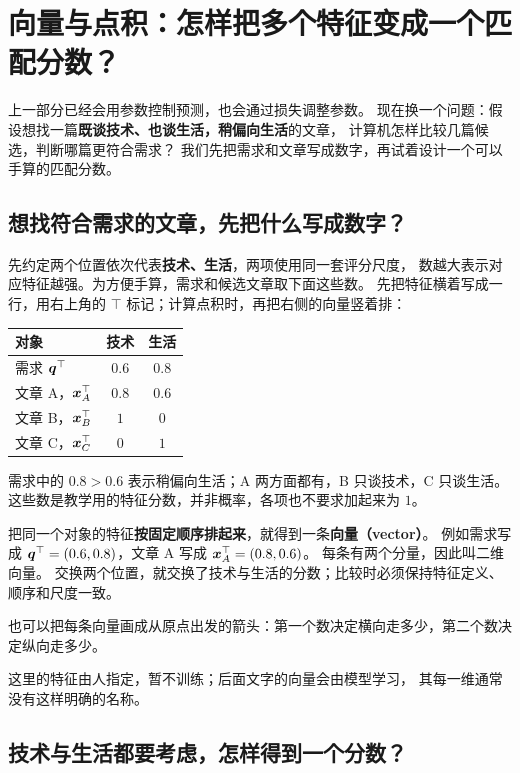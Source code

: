 \chapterrule
\section{向量与点积：怎样把多个特征变成一个匹配分数？}
\label{intro:vectors}
\label{intro:dot-product}

上一部分已经会用参数控制预测，也会通过损失调整参数。
现在换一个问题：假设想找一篇\textbf{既谈技术、也谈生活，稍偏向生活}的文章，
计算机怎样比较几篇候选，判断哪篇更符合需求？
我们先把需求和文章写成数字，再试着设计一个可以手算的匹配分数。

\subsection{想找符合需求的文章，先把什么写成数字？}

先约定两个位置依次代表\textbf{技术、生活}，两项使用同一套评分尺度，
数越大表示对应特征越强。为方便手算，需求和候选文章取下面这些数。
先把特征横着写成一行，用右上角的 $\top$ 标记；计算点积时，再把右侧的向量竖着排：
\begin{center}
\begin{tabular}{@{}lcc@{}}\toprule
对象 & 技术 & 生活\\\midrule
需求 $\boldsymbol{q}^\top$ & $0.6$ & $0.8$\\
文章 A，$\boldsymbol{x}_A^\top$ & $0.8$ & $0.6$\\
文章 B，$\boldsymbol{x}_B^\top$ & $1$ & $0$\\
文章 C，$\boldsymbol{x}_C^\top$ & $0$ & $1$\\\bottomrule
\end{tabular}
\end{center}
需求中的 $0.8>0.6$ 表示稍偏向生活；A 两方面都有，B 只谈技术，C 只谈生活。
这些数是教学用的特征分数，并非概率，各项也不要求加起来为 $1$。

\label{concept:vector}
把同一个对象的特征\textbf{按固定顺序排起来}，就得到一条\textbf{向量（vector）}。
例如需求写成 $\boldsymbol{q}^\top=(0.6,0.8)$，文章 A 写成 $\boldsymbol{x}_A^\top=(0.8,0.6)$。
每条有两个分量，因此叫二维向量。
交换两个位置，就交换了技术与生活的分数；比较时必须保持特征定义、顺序和尺度一致。

也可以把每条向量画成从原点出发的箭头：第一个数决定横向走多少，第二个数决定纵向走多少。


这里的特征由人指定，暂不训练；后面文字的向量会由模型学习，
其每一维通常没有这样明确的名称。

\subsection{技术与生活都要考虑，怎样得到一个分数？}

